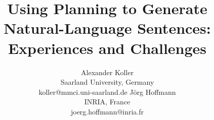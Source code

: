 \documentclass[letterpaper]{article}
\begin{document}
\title{Using Planning to Generate Natural-Language Sentences:\\
  Experiences and Challenges}

\author{
Alexander Koller \\ Saarland University, Germany \\ koller@mmci.uni-saarland.de
\And
J\"org Hoffmann \\ INRIA, France \\ joerg.hoffmann@inria.fr
}

\maketitle












\end{document}
